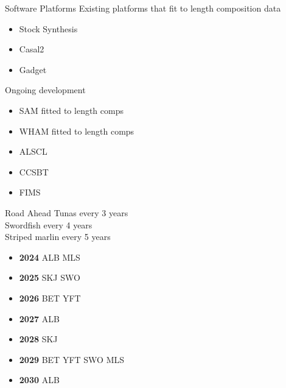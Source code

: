 \documentclass[aspectratio=169]{beamer}
\begin{document}

\begin{frame}{Software Platforms}\small
  Existing platforms that fit to length composition data
  \begin{itemize}
    \item[] Stock Synthesis\\[-1ex]
    \item[] Casal2\\[-1ex]
    \item[] Gadget\\[5ex]
  \end{itemize}
  Ongoing development
  \begin{itemize}
    \item[] SAM fitted to length comps \\[-1ex]
    \item[] WHAM fitted to length comps \\[-1ex]
    \item[] ALSCL \\[-1ex]
    \item[] CCSBT \\[-1ex]
    \item[] FIMS 
  \end{itemize}
\end{frame}


\begin{frame}{Road Ahead}\small
  Tunas every 3 years\\[0.5ex]
  Swordfish every 4 years\\[0.5ex]
  Striped marlin every 5 years\\[2ex]
  \begin{itemize}
    \item[] {\bf 2024} ALB MLS\\[-1ex]
    \item[] {\bf 2025} SKJ SWO\\[-1ex]
    \item[] {\bf 2026} BET YFT\\[-1ex]
    \item[] {\bf 2027} ALB\\[-1ex]
    \item[] {\bf 2028} SKJ\\[-1ex]
    \item[] {\bf 2029} BET YFT SWO MLS\\[-1ex]
    \item[] {\bf 2030} ALB
  \end{itemize}
\end{frame}
\end{document}
